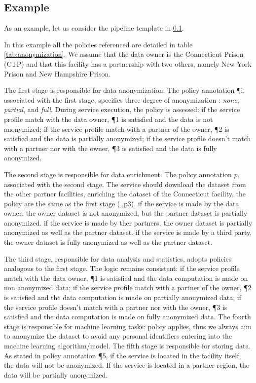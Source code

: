 \subsection{Example}\label{sec:example}


As an example, let us consider the pipeline template \tChartFunction in \cref{sec:example}.

In this example all the policies referenced are detailed in table \ref{tab:anonymization}.
We assume that the data owner is the Connecticut Prison (CTP) and that this facility has a partnership with two others, namely New York Prison and New Hampshire Prison.

The first stage is responsible for data anonymization. The  policy annotation \P{i}, associated with the first stage,
specifies three degree of anonymization : \emph{none}, \emph{partial}, and \emph{full}.
During service execution, the policy is assessed:
if the service profile match with the data owner, \P{1} is satisfied and the data is not anonymized;
if the service profile match with a partner of the owner, \P{2} is satisfied and the data is partially anonymized;
if the service profile doesn't match with a partner nor with the owner, \P{3} is satisfied and the data is fully anonymized.

The second stage is responsible for data enrichment. The policy annotation $p$, associated with the second stage.
The service should download the dataset from the other partner facilities, enriching the dataset of the Connecticut facility, the policy are the same as the first stage (,,p{3}).
if the service is made by the data owner, the owner dataset is not anonymized, but the partner dataset is partially anonymized.
if the service is made by ther partners, the owner dataset is partially anonymized as well as the partner dataset.
if the service is made by a third party, the owner dataset is fully anonymized as well as the partner dataset.





The third stage, responsible for data analysis and statistics, adopts policies analogous to the first stage. The logic remains consistent:
if the service profile match with the data owner, \P{1} is satisfied and the data computation is made on non anonymized data;
if the service profile match with a partner of the owner, \P{2} is satisfied and the data computation is made on partially anonymized data;
if the service profile doesn't match with a partner nor with the owner, \P{3} is satisfied and the data computation is made on fully anonymized data.
The fourth stage is responsible for machine learning tasks:
policy  applies, thus we always aim to anonymize the dataset to avoid any personal identifiers entering into the machine learning algorithm/model.
The fifth stage is responsible for storing data. As stated in policy annotation \P{5}, if the service is located in the facility itself, the data will not be anonymized.
If the service is located in a partner region, the data will be partially anonymized.

